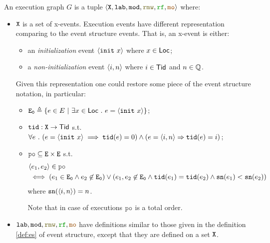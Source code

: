 \documentclass[12pt]{article}
\begin{document}
\begin{definition}
  An execution graph $G$ is a tuple $\tup{\lX, \lLAB, \lMOD, \lRMW, \lRF, \lMO}$ where:
  \begin{itemize}

  \item ${\mathtt{X}}$ is a set of x-events. 
    Execution events have different representation comparing to the event structure events. 
    That is, an x-event is either:
    \begin{itemize}
      \item an \emph{initialization} event $\langle {\mathtt{init}}~x \rangle$ where $x \in \mathsf{Loc}$;
      \item a \emph{non-initialization} event $\langle i, n \rangle$ where $i \in \mathsf{Tid}$ and $n \in {\mathbb{Q}}$.
    \end{itemize}
    Given this representation one could restore some piece of the event structure notation, 
    in particular:
    \begin{itemize}

      \item ${\mathtt{E_0}} \triangleq \{e \in E ~|~ \exists{x} \in \mathsf{Loc} ~.~ e = \langle {\mathtt{init}}~x \rangle\}$;

      \item ${\mathtt{tid}} : {\mathtt{X}} \rightarrow \mathsf{Tid}$ s.t. \\
        $\forall{e} ~.~ (e = \langle {\mathtt{init}}~x \rangle \implies {\mathtt{tid}}(e) = 0) \wedge 
        (e = \langle i, n \rangle \Rightarrow {\mathtt{tid}}(e) = i)$;
      
      \item $\lPO \subseteq \lE \times \lE$ s.t. \\
        \begin{equation*}
          \begin{split}
            & \tup{e_1, e_2} \in \lPO \\
            & \iff (e_1 \in \lEi \wedge e_2 \not\in \lEi) \vee 
              (e_1, e_2 \not\in \lEi \wedge \lTID(e_1) = \lTID(e_2) \wedge
              \lSN(e_1) < \lSN(e_2))
          \end{split}
        \end{equation*}
        where ${\mathtt{sn}}(\langle i, n \rangle) = n$.

        Note that in case of executions $\lPO$ is a total order.
    \end{itemize}
    
  \item $\lLAB, \lMOD, \lRMW, \lRF, \lMO$ have definitions similar to those given
    in the definition \ref{def:es} of event structure,
    except that they are defined on a set ${\mathtt{X}}$.

  \end{itemize}
\end{definition}
\end{document}
